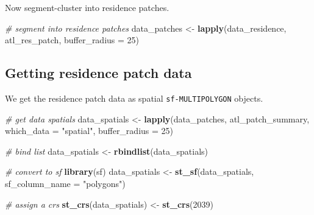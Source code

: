 \documentclass[
]{scrreprt}
\newenvironment{Shaded}{}{}
\newcommand{\CommentTok}[1]{\textcolor[rgb]{0.38,0.63,0.69}{\textit{#1}}}
\newcommand{\DataTypeTok}[1]{\textcolor[rgb]{0.56,0.13,0.00}{#1}}
\newcommand{\DecValTok}[1]{\textcolor[rgb]{0.25,0.63,0.44}{#1}}
\newcommand{\KeywordTok}[1]{\textcolor[rgb]{0.00,0.44,0.13}{\textbf{#1}}}
\newcommand{\NormalTok}[1]{#1}
\newcommand{\OperatorTok}[1]{\textcolor[rgb]{0.40,0.40,0.40}{#1}}
\newcommand{\StringTok}[1]{\textcolor[rgb]{0.25,0.44,0.63}{#1}}
\begin{document}
\begin{Shaded}
\end{Shaded}

Now segment-cluster into residence patches.

\begin{Shaded}
\begin{Highlighting}[]
\CommentTok{\# segment into residence patches}
\NormalTok{data\_patches <{-}}\StringTok{ }\KeywordTok{lapply}\NormalTok{(data\_residence, atl\_res\_patch,}
                       \DataTypeTok{buffer\_radius =} \DecValTok{25}\NormalTok{)}
\end{Highlighting}
\end{Shaded}

\hypertarget{getting-residence-patch-data}{%
\subsection{Getting residence patch data}\label{getting-residence-patch-data}}

We get the residence patch data as spatial \texttt{sf-MULTIPOLYGON} objects.

\begin{Shaded}
\begin{Highlighting}[]
\CommentTok{\# get data spatials}
\NormalTok{data\_spatials <{-}}\StringTok{ }\KeywordTok{lapply}\NormalTok{(data\_patches, atl\_patch\_summary,}
                        \DataTypeTok{which\_data =} \StringTok{"spatial"}\NormalTok{,}
                        \DataTypeTok{buffer\_radius =} \DecValTok{25}\NormalTok{)}

\CommentTok{\# bind list}
\NormalTok{data\_spatials <{-}}\StringTok{ }\KeywordTok{rbindlist}\NormalTok{(data\_spatials)}

\CommentTok{\# convert to sf}
\KeywordTok{library}\NormalTok{(sf)}
\NormalTok{data\_spatials <{-}}\StringTok{ }\KeywordTok{st\_sf}\NormalTok{(data\_spatials, }\DataTypeTok{sf\_column\_name =} \StringTok{"polygons"}\NormalTok{)}

\CommentTok{\# assign a crs}
\KeywordTok{st\_crs}\NormalTok{(data\_spatials) <{-}}\StringTok{ }\KeywordTok{st\_crs}\NormalTok{(}\DecValTok{2039}\NormalTok{)}
\end{Highlighting}
\end{Shaded}
\end{document}

